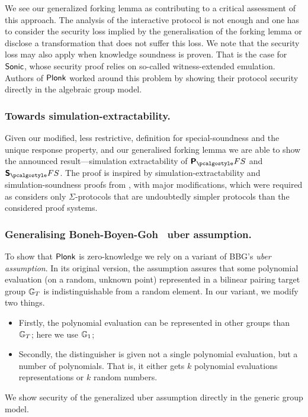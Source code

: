 \documentclass[runningheads,11pt]{llncs}
\theoremstyle{definition} \newtheorem{definition}[theorem]{Definition}
\begin{document}
  
We see our generalized forking lemma as contributing to a critical assessment of
this approach. The analysis of the interactive protocol is not enough and one
has to consider the security loss implied by the generalisation of the forking
lemma or disclose a transformation that does not suffer this loss. We note that the security loss may also apply when knowledge
soundness is proven. That is the case for ${\textnormal{\textsf{Sonic}}}$, whose security proof relies
on so-called witness-extended emulation. Authors of $\textnormal{\textsf{Plonk}}$ worked around this
problem by showing their protocol security directly in the algebraic group model.

\subsubsection{Towards simulation-extractability.} Given our modified, less
restrictive, definition for special-soundness and the unique response property,
and our generalised forking lemma we are able to show the announced
result---simulation extractability of $\plonkprotfs$ and $\sonicprotfs$. The
proof is inspired by simulation-extractability and simulation-soundness proofs
from \cite{INDOCRYPT:FKMV12}, with major modifications, which were required as
\cite{INDOCRYPT:FKMV12} considers only $\Sigma$-protocols
that are undoubtedly simpler protocols than the considered proof systems.

\subsubsection{Generalising Boneh-Boyen-Goh~\cite{EC:BonBoyGoh05} uber assumption.}
To show that $\textnormal{\textsf{Plonk}}$ is zero-knowledge we rely on a variant of
BBG's \emph{uber assumption}. In its original version, the
assumption assures that some polynomial evaluation (on a random, unknown point)
represented in a bilinear pairing target group $\mathbb{G}_T$ is indistinguishable
from a random element. In our variant, we modify two things.
\begin{itemize}
\item Firstly, the polynomial evaluation can be represented in other groups
  than $\mathbb{G}_T$; here we use $\mathbb{G}_1$;
\item Secondly, the distinguisher is given not a single polynomial evaluation,
  but a number of polynomials. That is, it either gets $k$ polynomial
  evaluations representations or $k$ random numbers.
\end{itemize}
We show security of the generalized uber assumption directly in the generic
group model.
\end{document}
